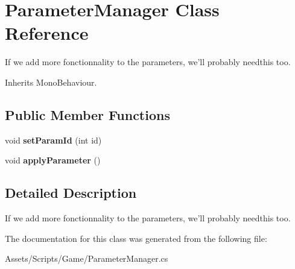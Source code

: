 \hypertarget{class_parameter_manager}{\section{Parameter\-Manager Class Reference}
\label{class_parameter_manager}
}


If we add more fonctionnality to the parameters, we'll probably needthis too.  




Inherits Mono\-Behaviour.

\subsection*{Public Member Functions}
\begin{DoxyCompactItemize}
\item 
\hypertarget{class_parameter_manager_af649f46db65e215cb18d9c84d594ea5b}{void {\bfseries set\-Param\-Id} (int id)}\label{class_parameter_manager_af649f46db65e215cb18d9c84d594ea5b}

\item 
\hypertarget{class_parameter_manager_ad1bfc3c46b0bb81ac5b0784137bc7d2e}{void {\bfseries apply\-Parameter} ()}\label{class_parameter_manager_ad1bfc3c46b0bb81ac5b0784137bc7d2e}

\end{DoxyCompactItemize}


\subsection{Detailed Description}
If we add more fonctionnality to the parameters, we'll probably needthis too. 



The documentation for this class was generated from the following file\-:\begin{DoxyCompactItemize}
\item 
Assets/\-Scripts/\-Game/Parameter\-Manager.\-cs\end{DoxyCompactItemize}
